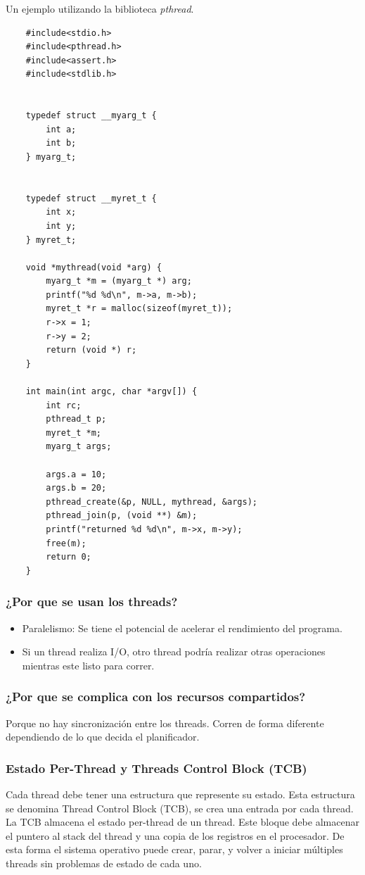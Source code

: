 \documentclass[titlepage,a4paper]{article}
\begin{document}
Un ejemplo utilizando la biblioteca \emph{pthread}.
\begin{verbatim}
    #include<stdio.h>
    #include<pthread.h>
    #include<assert.h>
    #include<stdlib.h>
    
    
    typedef struct __myarg_t {
        int a;
        int b;
    } myarg_t;
    
    
    typedef struct __myret_t {
        int x;
        int y;
    } myret_t;
    
    void *mythread(void *arg) {
        myarg_t *m = (myarg_t *) arg;
        printf("%d %d\n", m->a, m->b);
        myret_t *r = malloc(sizeof(myret_t));
        r->x = 1;
        r->y = 2;
        return (void *) r;
    }
    
    int main(int argc, char *argv[]) {
        int rc;
        pthread_t p;
        myret_t *m;
        myarg_t args;
    
        args.a = 10;
        args.b = 20;
        pthread_create(&p, NULL, mythread, &args);
        pthread_join(p, (void **) &m);
        printf("returned %d %d\n", m->x, m->y);
        free(m);
        return 0;
    }
\end{verbatim}

\subsubsection*{¿Por que se usan los threads?}
\begin{itemize}
    \item Paralelismo: Se tiene el potencial de acelerar el rendimiento del programa.
    \item Si un thread realiza I/O, otro thread podría realizar otras operaciones mientras este listo para correr.
\end{itemize}

\subsubsection*{¿Por que se complica con los recursos compartidos?}
Porque no hay sincronización entre los threads. Corren de forma diferente dependiendo de lo que decida el planificador.


\subsubsection*{Estado Per-Thread y Threads Control Block (TCB)}
Cada thread debe tener una estructura que represente su estado. Esta estructura se denomina Thread Control Block (TCB), se crea una entrada por cada thread. La TCB almacena el estado per-thread de un thread. Este bloque debe almacenar el puntero al stack del thread y una copia de los registros en el procesador. De esta forma el sistema operativo puede crear, parar, y volver a iniciar múltiples threads sin problemas de estado de cada uno.
\end{document}
